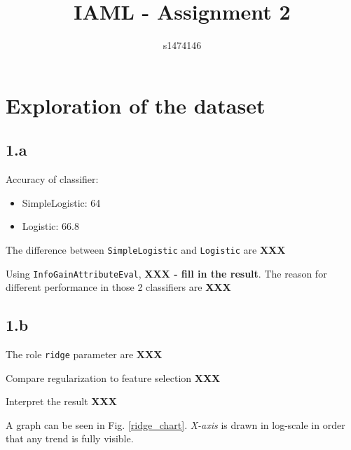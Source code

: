 \documentclass[12pt,journal,compsoc]{IEEEtran}
\begin{document}
%
\title{IAML - Assignment 2}
\author{s1474146}

%
\maketitle


\section{Exploration of the dataset}

\subsection*{1.a}
Accuracy of classifier:
\begin{itemize}
\item SimpleLogistic: 64%
\item Logistic: 66.8%
\end{itemize}

The difference between \texttt{SimpleLogistic} and \texttt{Logistic} are \textbf{XXX}

Using \texttt{InfoGainAttributeEval}, \textbf{XXX - fill in the result}. The reason for different performance in those 2 classifiers are \textbf{XXX}


\subsection*{1.b}
The role \texttt{ridge} parameter are \textbf{XXX}

Compare regularization to feature selection \textbf{XXX}

Interpret the result \textbf{XXX}

A graph can be seen in Fig. \ref{ridge_chart}. \textit{X-axis} is drawn in log-scale in order that any trend is fully visible.
\end{document}

